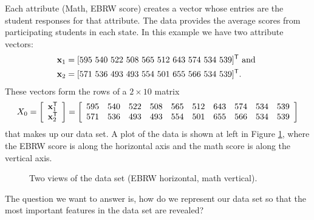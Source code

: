 Each attribute (Math, EBRW score) creates a vector whose entries are the student responses for that attribute. The data provides the average scores from participating students in each state. In this example we have two attribute vectors: 
\begin{align*}
\vx_1 &= [595 \ 540 \ 522 \ 508 \ 565 \ 512 \ 643 \ 574 \ 534 \ 539]^{\tr} \text{ and } \\
\vx_2 &= [571 \ 536 \ 493 \ 493 \ 554 \ 501 \ 655 \ 566 \ 534 \ 539]^{\tr}.
\end{align*}
 These vectors form the rows of a $2 \times 10$ matrix 
 \[X_0 = \left[ \begin{array}{c} \mathbf{x}_1^{\mathsf{T}} \\ \mathbf{x}_2^{\mathsf{T}} \end{array} \right] = \left[ \begin{array}{cccccccccc}  595&540&522&508&565&512&643&574&534&539
\\ 571&536&493&493&554&501&655&566&534&539
\end {array} \right] \]
that makes up our data set. A plot of the data is shown at left in Figure \ref{F:PCA_data_plot}, where the EBRW score is along the horizontal axis and the math score is along the vertical axis.
\begin{figure}[ht]
  \begin{center}
    \caption{Two views of the data set (EBRW horizontal, math vertical).}
    \label{F:PCA_data_plot}
  \end{center}
\end{figure}
The question we want to answer is, how do we represent our data set so that the most important features in the data set are revealed?  

